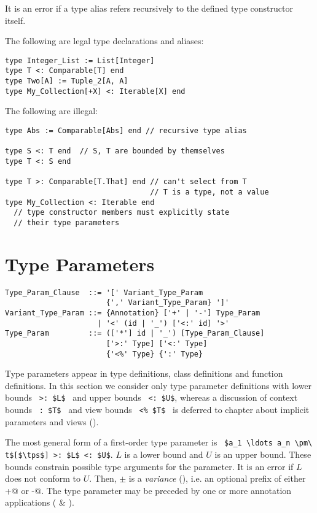 It is an error if a type alias refers recursively to the defined type constructor itself. 

\example The following are legal type declarations and aliases:
\begin{lstlisting}
type Integer_List := List[Integer]
type T <: Comparable[T] end
type Two[A] := Tuple_2[A, A]
type My_Collection[+X] <: Iterable[X] end
\end{lstlisting}
The following are illegal:
\begin{lstlisting}
type Abs := Comparable[Abs] end // recursive type alias

type S <: T end  // S, T are bounded by themselves
type T <: S end

type T >: Comparable[T.That] end // can't select from T
                                 // T is a type, not a value
type My_Collection <: Iterable end
  // type constructor members must explicitly state
  // their type parameters
\end{lstlisting}






\section{Type Parameters}

\syntax\begin{lstlisting}
Type_Param_Clause  ::= '[' Variant_Type_Param 
                       {',' Variant_Type_Param} ']'
Variant_Type_Param ::= {Annotation} ['+' | '-'] Type_Param
                     | '<' (id | '_') ['<:' id] '>'
Type_Param         ::= (['*'] id | '_') [Type_Param_Clause]
                       ['>:' Type] ['<:' Type]
                       {'<%' Type} {':' Type}
\end{lstlisting}

Type parameters appear in type definitions, class definitions and function definitions. In this section we consider only type parameter definitions with lower bounds ~\lstinline!>: $L$!~ and upper bounds ~\lstinline!<: $U$!, whereas a discussion of context bounds ~\lstinline!: $T$!~ and view bounds ~\lstinline!<% $T$!~ is deferred to chapter about implicit parameters and views ().

The most general form of a first-order type parameter is ~\lstinline!$a_1 \ldots a_n \pm\ t$[$\tps$] >: $L$ <: $U$!. $L$ is a lower bound and $U$ is an upper bound. These bounds constrain possible type arguments for the parameter. It is an error if $L$ does not conform to $U$. Then, $\pm$ is a {\em variance} (), i.e. an optional prefix of either \lstinline@+@ or \lstinline@-@. The type parameter may be preceded by one or more annotation applications ( \& ).

